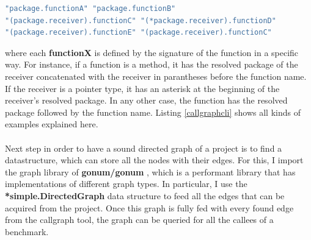 \documentclass{seal_thesis}
\begin{document}
\begin{lstlisting}[caption=Output format of callgraph CLI tool., label={callgraphcli}, language=Go, frame=single] 
"package.functionA" "package.functionB"
"(package.receiver).functionC" "(*package.receiver).functionD"
"(package.receiver).functionE" "(package.receiver).functionC"
\end{lstlisting}

\noindent where each \textbf{functionX} is defined by the signature of the function in a specific way. For instance, if a function is a method, it has the resolved package of the receiver concatenated with the receiver in parantheses before the function name. If the receiver is a pointer type, it has an asterisk at the beginning of the receiver's resolved package. In any other case, the function has the resolved package followed by the function name. Listing \ref{callgraphcli} shows all kinds of examples explained here.\\
\\
Next step in order to have a sound directed graph of a project is to find a datastructure, which can store all the nodes with their edges. For this, I import the graph library of \textbf{gonum/gonum} \cite{gonum/gonum}, which is a performant library that has implementations of different graph types. In particular, I use the \textbf{*simple.DirectedGraph} data structure to feed all the edges that can be acquired from the project. Once this graph is fully fed with every found edge from the callgraph tool, the graph can be queried for all the callees of a benchmark.
\end{document}
